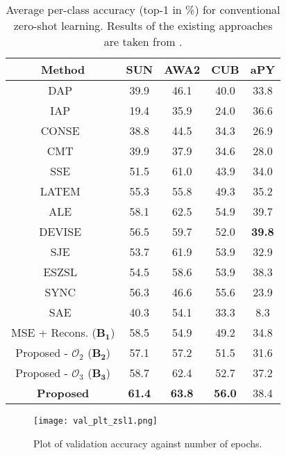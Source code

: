\documentclass[10pt,twocolumn,letterpaper]{article}
\begin{document}
\begin{table}[t!]
	\centering
	\small
	\begin{tabular}{|c|c|c|c|c|}
		\hline
		\textbf{Method}            & \textbf{SUN}  & \textbf{AWA2} & \textbf{CUB}  & \textbf{aPY}  \\ \hline
		DAP~\cite{lampert2014attribute}               & 39.9          & 46.1          & 40.0          & 33.8          \\ 
		IAP~\cite{lampert2014attribute}              & 19.4          & 35.9          & 24.0          & 36.6          \\ 
		CONSE~\cite{norouzi2013zero}             & 38.8          & 44.5          & 34.3          & 26.9          \\ 
		CMT~\cite{socher2013zero}               & 39.9          & 37.9          & 34.6          & 28.0          \\ 
		SSE~\cite{zhang2015zero}               & 51.5          & 61.0          & 43.9          & 34.0          \\ 
		LATEM~\cite{xian2016latent}             & 55.3          & 55.8          & 49.3          & 35.2          \\ 
		ALE~\cite{akata2016label}               & 58.1          & 62.5          & 54.9          & 39.7          \\ 
		DEVISE~\cite{frome2013devise}            & 56.5          & 59.7          & 52.0          & \textbf{39.8} \\ 
		SJE~\cite{akata2015evaluation}               & 53.7          & 61.9          & 53.9          & 32.9          \\ 
		ESZSL~\cite{romera2015embarrassingly}             & 54.5          & 58.6          & 53.9          & 38.3          \\ 
		SYNC~\cite{changpinyo2016synthesized}              & 56.3          & 46.6          & 55.6          & 23.9          \\ 
		SAE~\cite{Kodirov_2017_CVPR}               & 40.3          & 54.1          & 33.3          & 8.3           \\ \hline
		MSE + Recons. ($\mathbf{B_1}$)&58.5   &54.9    &49.2  &34.8 \\ 
		Proposed - $\mathcal{O}_2$ ($\mathbf{B_2}$)  &57.1 &57.2 &51.5 &31.6\\ 
		Proposed - $\mathcal{O}_3$ ($\mathbf{B_3}$)  &58.7 &62.4 &52.7 &37.2\\ \hline
		\textbf{Proposed} & \textbf{61.4} & \textbf{63.8} & \textbf{56.0} & 38.4          \\ \hline 
	\end{tabular}
	\caption{\small Average per-class accuracy (top-1 in \%) for conventional zero-shot learning. Results of the existing approaches are taken from \cite{xian2017zero1}.}
	\label{zsl-results}
\end{table}
\begin{figure}[t!]
	\centering
	\texttt{[image: val\_plt\_zsl1.png]}
	\caption{\small Plot of validation accuracy against number of epochs.}
	\label{val-plot} 
\end{figure}
\end{document}
